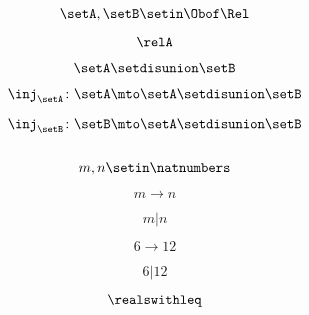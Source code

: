 \begin{forslides}
    \begin{equation}
        \label{eq:combination-119}
       \setA,\setB\setin \Obof\Rel
    \end{equation}
    
        \begin{equation}
        \label{eq:combination-120}
        \relA
    \end{equation}
       
     \begin{equation}
        \label{eq:combination-121}
        \setA \setdisunion \setB
    \end{equation}
    
     \begin{equation}
        \label{eq:combination-122}
        \inj_\setA\colon \setA\mto \setA \setdisunion\setB
    \end{equation}
    
    \begin{equation}
        \label{eq:combination-123}
        \inj_\setB\colon \setB\mto \setA \setdisunion\setB
    \end{equation}
    
     \begin{equation}
        \label{eq:combination-124}
    \end{equation}
    
     \begin{equation}
        \label{eq:combination-125}
        m,n\setin \natnumbers
    \end{equation}
    
    \begin{equation}
        \label{eq:combination-126}
        m\to n
    \end{equation}
    
     \begin{equation}
        \label{eq:combination-127}
        m | n
    \end{equation}
    
     \begin{equation}
        \label{eq:combination-128}
       6\to 12
    \end{equation}
    
    \begin{equation}
        \label{eq:combination-129}
       6 | 12
    \end{equation}

       \begin{equation}
        \label{eq:combination-130}
        \realswithleq
    \end{equation}
       

\end{forslides}
